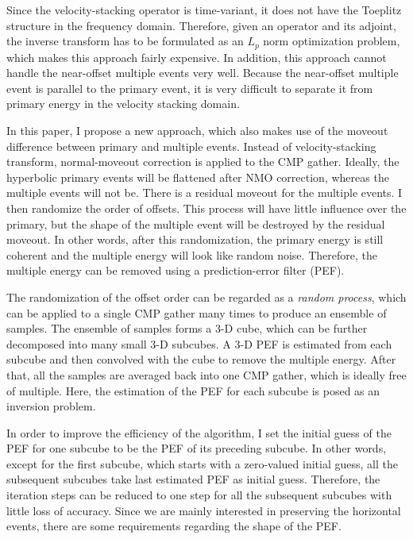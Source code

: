 Since the velocity-stacking operator is time-variant, it does not have
the Toeplitz structure in the frequency domain. Therefore, given an operator
and its adjoint, the inverse transform has to be formulated as an $L_p$ norm
optimization problem, which makes this approach fairly expensive. In addition, 
this approach cannot handle the near-offset multiple events very well. 
Because the near-offset multiple event is parallel to the primary event, 
it is very difficult to separate it from primary energy in the velocity 
stacking domain.

In this paper, I propose a new approach, which also makes use of the moveout
difference between primary and multiple events. Instead of velocity-stacking 
transform, normal-moveout correction is applied to the CMP gather. Ideally,  
the hyperbolic primary events will be flattened after NMO correction, whereas 
the multiple events
will not be. There is a residual moveout for the multiple events. I then
randomize the order of offsets. This process will have little influence over the
primary, but the shape of the multiple event will be destroyed by the residual
moveout. In other words, after this randomization, the primary energy is still
coherent and the multiple energy will look like random noise. Therefore, the
multiple energy can be removed using a prediction-error filter (PEF). 

The randomization of the offset order can be regarded as a {\em  random 
process}, which can be applied to a single CMP gather many times to produce 
an ensemble of samples. The ensemble of samples forms a 3-D cube, which can be 
further 
decomposed into many small 3-D subcubes. A 3-D PEF is estimated from each 
subcube and then convolved with the cube to remove the multiple energy. 
After that, all the samples are averaged back into one CMP gather, 
which is ideally free of multiple. 
Here, the estimation of the PEF for each subcube is posed as an inversion 
problem.

In order to improve the efficiency of the algorithm, I set the initial guess of 
the PEF for one subcube to be the PEF of its preceding subcube. 
In other words, except for the first 
subcube, which starts with a zero-valued initial guess, all the subsequent 
subcubes take last estimated PEF as initial guess. Therefore, the iteration 
steps can be reduced to one step for all the subsequent subcubes with little 
loss of accuracy. Since we are mainly interested in preserving the horizontal 
events, there are some requirements regarding the shape of the PEF. 

